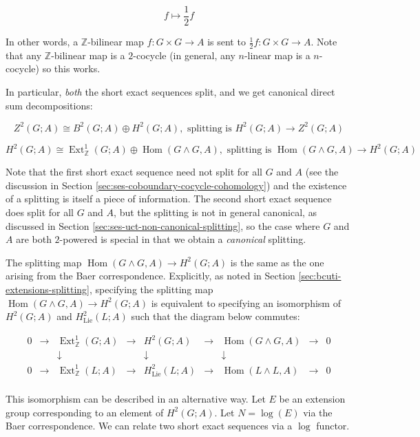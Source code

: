 $$f \mapsto \frac{1}{2}f$$

In other words, a $\mathbb{Z}$-bilinear map $f: G \times G \to A$ is
sent to $\frac{1}{2}f:G \times G \to A$. Note that any
$\mathbb{Z}$-bilinear map is a $2$-cocycle (in general, any $n$-linear
map is a $n$-cocycle) so this works.

In particular, {\em both} the short exact sequences split, and we get
canonical direct sum decompositions:

$$Z^2(G;A) \cong B^2(G;A) \oplus H^2(G;A), \text{ splitting is } H^2(G;A) \to Z^2(G;A)$$

$$H^2(G;A) \cong \operatorname{Ext}^1_{\mathbb{Z}}(G;A) \oplus \operatorname{Hom}(G \wedge G,A), \text{ splitting is } \operatorname{Hom}(G \wedge G,A) \to H^2(G;A)$$

Note that the first short exact sequence need not split for all $G$
and $A$ (see the discussion in Section
\ref{sec:ses-coboundary-cocycle-cohomology}) and the existence of a
splitting is itself a piece of information. The second short exact
sequence does split for all $G$ and $A$, but the splitting is not in
general canonical, as discussed in Section
\ref{sec:ses-uct-non-canonical-splitting}, so the case where $G$ and
$A$ are both $2$-powered is special in that we obtain a {\em
  canonical} splitting.

The splitting map $\operatorname{Hom}(G\wedge G,A) \to H^2(G;A)$ is
the same as the one arising from the Baer correspondence. Explicitly,
as noted in Section \ref{sec:bcuti-extensions-splitting}, specifying the
splitting map $\operatorname{Hom}(G \wedge G, A) \to H^2(G;A)$ is
equivalent to specifying an isomorphism of $H^2(G;A)$ and
$H^2_{\text{Lie}}(L;A)$ such that the diagram below commutes:

$$\begin{array}{ccccccccc}
  0 &\to &\operatorname{Ext}^1_{\mathbb{Z}}(G;A) &\to &H^2(G;A) &\to &\operatorname{Hom}(G \wedge G,A) &\to &0\\
  & & \downarrow & & \downarrow & & \downarrow & & \\
  0 &\to &\operatorname{Ext}^1_{\mathbb{Z}}(L;A) & \to & H^2_{\text{Lie}}(L;A) & \to & \operatorname{Hom}(L \wedge L, A) & \to & 0\\
\end{array}$$

This isomorphism can be described in an alternative way. Let $E$ be an
extension group corresponding to an element of $H^2(G;A)$. Let $N =
\log(E)$ via the Baer correspondence. We can relate two short exact
sequences via a $\log$ functor.

